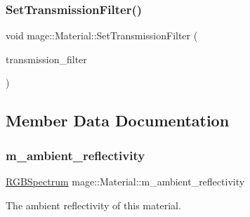 \hypertarget{structmage_1_1_material_abc6f63bd40b00c81bc799ef1f2ca01e9}{}\label{structmage_1_1_material_abc6f63bd40b00c81bc799ef1f2ca01e9} 
\subsubsection{\texorpdfstring{Set\+Transmission\+Filter()}{SetTransmissionFilter()}\hspace{0.1cm}{\footnotesize\ttfamily [2/2]}}
{\footnotesize\ttfamily void mage\+::\+Material\+::\+Set\+Transmission\+Filter (\begin{DoxyParamCaption}\item[{\hyperlink{structmage_1_1_r_g_b_spectrum}{R\+G\+B\+Spectrum} \&\&}]{transmission\+\_\+filter }\end{DoxyParamCaption})\hspace{0.3cm}{\ttfamily [noexcept]}}



\subsection{Member Data Documentation}
\hypertarget{structmage_1_1_material_ad8fb842410fe751ad220185271a00448}{}\label{structmage_1_1_material_ad8fb842410fe751ad220185271a00448} 
\subsubsection{\texorpdfstring{m\+\_\+ambient\+\_\+reflectivity}{m\_ambient\_reflectivity}}
{\footnotesize\ttfamily \hyperlink{structmage_1_1_r_g_b_spectrum}{R\+G\+B\+Spectrum} mage\+::\+Material\+::m\+\_\+ambient\+\_\+reflectivity\hspace{0.3cm}{\ttfamily [private]}}

The ambient reflectivity of this material. \hypertarget{structmage_1_1_material_a72a90b9d339d705b5fd46098df5892e2}{}\label{structmage_1_1_material_a72a90b9d339d705b5fd46098df5892e2} 
